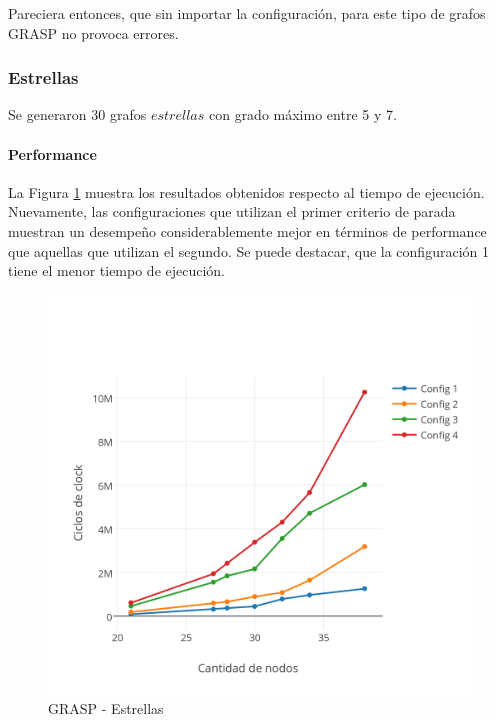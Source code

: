 Pareciera entonces, que sin importar la configuración, para este tipo de grafos GRASP no provoca errores.
\subsubsection{Estrellas}

Se generaron 30 grafos $estrellas$ con grado máximo entre 5 y 7.

\paragraph{Performance}

La Figura \ref{fig:4B} muestra los resultados obtenidos respecto al tiempo de ejecución. Nuevamente, las configuraciones que utilizan el primer criterio de parada muestran un desempeño considerablemente mejor en términos de performance que aquellas que utilizan el segundo.
Se puede destacar, que la configuración 1 tiene el menor tiempo de ejecución.

\begin{figure}[htb]
	\begin{center}
    		\includegraphics[scale=0.8]{imagenes/grasp-estrellas-tiempo.png}
	\end{center}
	\caption{GRASP - Estrellas}\label{fig:4B}
\end{figure}

